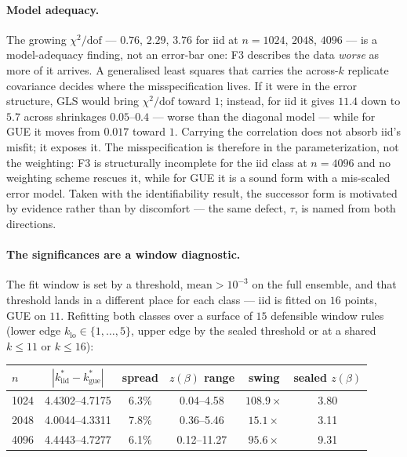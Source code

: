 \documentclass[11pt]{article}
\newcommand{\kstar}{k^{*}}
\begin{document}
\paragraph{Model adequacy.} The growing $\chi^2/\mathrm{dof}$ --- $0.76$, $2.29$, $3.76$ for
iid at $n=1024$, $2048$, $4096$ --- is a model-adequacy finding, not an error-bar one: F3
describes the data \emph{worse} as more of it arrives. A generalised least squares that
carries the across-$k$ replicate covariance decides where the misspecification lives. If it
were in the error structure, GLS would bring $\chi^2/\mathrm{dof}$ toward $1$; instead, for
iid it gives $11.4$ down to $5.7$ across shrinkages $0.05$--$0.4$ --- worse than the diagonal
model --- while for GUE it moves from $0.017$ toward $1$. Carrying the correlation does not
absorb iid's misfit; it exposes it. The misspecification is therefore in the parameterization,
not the weighting: F3 is structurally incomplete for the iid class at $n=4096$ and no weighting
scheme rescues it, while for GUE it is a sound form with a mis-scaled error model. Taken with
the identifiability result, the successor form is motivated by evidence rather than by
discomfort --- the same defect, $\tau$, is named from both directions.

\paragraph{The significances are a window diagnostic.} The fit window is set by a threshold,
$\text{mean}>10^{-3}$ on the full ensemble, and that threshold lands in a different place for
each class --- iid is fitted on $16$ points, GUE on $11$. Refitting both classes over a surface
of $15$ defensible window rules (lower edge $k_{\mathrm{lo}}\in\{1,\dots,5\}$, upper edge by
the sealed threshold or at a shared $k\le11$ or $k\le16$):

\begin{table}[h]
\centering
\small
\begin{tabular}{lccccc}
\toprule
$n$ & $|\kstar_{\mathrm{iid}}-\kstar_{\mathrm{gue}}|$ & spread & $z(\beta)$ range & swing &
sealed $z(\beta)$ \\
\midrule
1024 & 4.4302--4.7175 & 6.3\% & 0.04--4.58 & $108.9\times$ & 3.80 \\
2048 & 4.0044--4.3311 & 7.8\% & 0.36--5.46 & $15.1\times$ & 3.11 \\
4096 & 4.4443--4.7277 & 6.1\% & 0.12--11.27 & $95.6\times$ & 9.31 \\
\bottomrule
\end{tabular}
\end{table}
\end{document}
